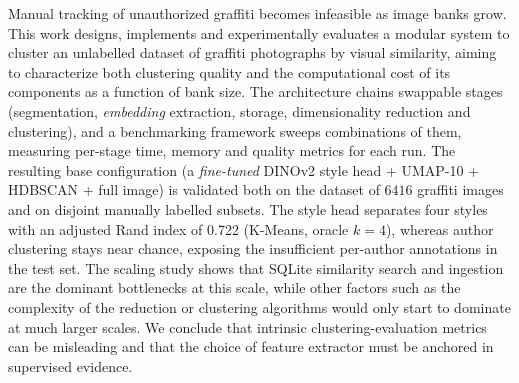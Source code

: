 Manual tracking of unauthorized graffiti becomes infeasible as image banks
grow. This work designs, implements and experimentally evaluates a modular
system to cluster an unlabelled dataset of graffiti photographs by visual
similarity, aiming to characterize both clustering quality and the
computational cost of its components as a function of bank size. The
architecture chains swappable stages (segmentation, \textit{embedding}
extraction, storage, dimensionality reduction and clustering), and a
benchmarking framework sweeps combinations of them, measuring per-stage time,
memory and quality metrics for each run. The resulting base configuration (a
\textit{fine-tuned} DINOv2 style head + UMAP-10 + HDBSCAN + full image) is
validated both on the dataset of $6416$ graffiti images and on disjoint
manually labelled subsets. The style head separates four styles with an
adjusted Rand index of 0.722 (K-Means, oracle $k{=}4$), whereas author
clustering stays near chance, exposing the insufficient per-author annotations
in the test set. The scaling study shows that SQLite similarity search and
ingestion are the dominant bottlenecks at this scale, while other factors such
as the complexity of the reduction or clustering algorithms would only start to
dominate at much larger scales. We conclude that intrinsic
clustering-evaluation metrics can be misleading and that the choice of feature
extractor must be anchored in supervised evidence.
